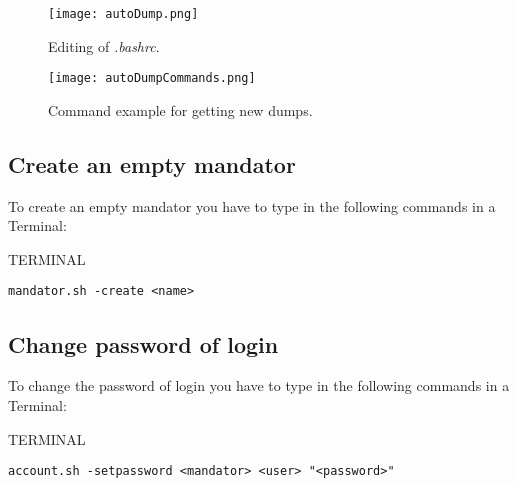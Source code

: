 \documentclass[10pt,a4paper]{article}
\begin{document}
\begin{figure}[h!tp]
\begin{center}

\texttt{[image: autoDump.png]}
%
\end{center}
%
\caption{Editing of \textit{.bashrc}.}
\label{fig:autoDump}
%
\end{figure}

\begin{figure}[h!tp]
\begin{center}

\texttt{[image: autoDumpCommands.png]}
%
\end{center}
%
\caption{Command example for getting new dumps.}
\label{fig:autoDumpCommands}
%
\end{figure}

\subsection{Create an empty mandator}
To create an empty mandator you have to type in the following commands in a Terminal:

\begin{command}{TERMINAL}

\begin{lstlisting}
mandator.sh -create <name>
\end{lstlisting}

\noindent
{}

\end{command}

\subsection{Change password of login}
To change the password of login you have to type in the following commands in a Terminal:

\begin{command}{TERMINAL}

\begin{lstlisting}
account.sh -setpassword <mandator> <user> "<password>"
\end{lstlisting}

\noindent
{}

\end{command}
\end{document}
